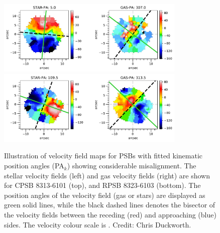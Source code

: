  \begin{figure}
    \centering
    \includegraphics[width=0.8\textwidth]{images/PAplots/PAplotsCPSB/8313-6101-PA.pdf}
    \includegraphics[width=0.8\textwidth]{images/PAplots/PAplotsRPSB/8323-6103-PA.pdf}
    \caption[Examples of PSBs showing significant kinematic PA misalignment $\Delta$PA$_{k}$]{Illustration of velocity field maps for PSBs with fitted kinematic position angles (PA$_{k}$) showing considerable misalignment. The stellar velocity fields (left) and gas velocity fields (right) are shown for CPSB 8313-6101 (top), and RPSB 8323-6103 (bottom). The position angles of the velocity field (gas or stars) are displayed as green solid lines, while the black dashed lines denotes the bisector of the velocity fields between the receding (red) and approaching (blue) sides. The velocity colour scale is \kms. Credit: Chris Duckworth.}
    \label{fig:CPSB-8313-6101-PA}
\end{figure}


